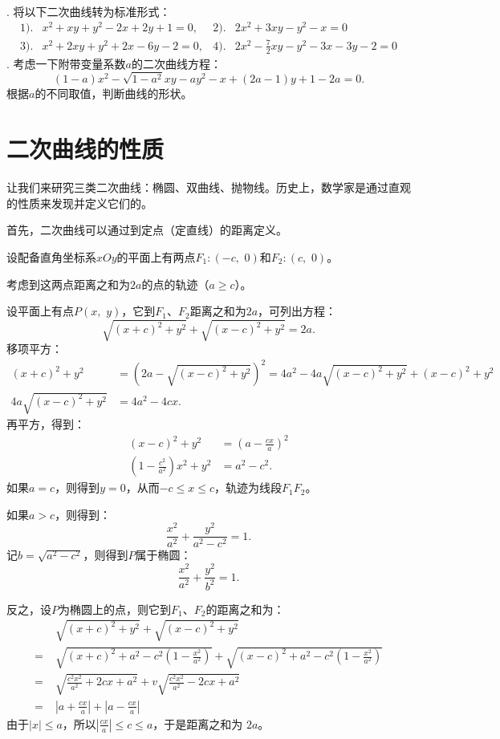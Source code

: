 \documentclass[12pt,UTF8]{ctexbook}
\begin{document}
\begin{xt}
    \mbox{} \\
    . 将以下二次曲线转为标准形式：
    \begin{align*}
        1).& x^2 + xy +y^2 - 2x + 2y + 1 = 0,  &2).& 2x^2 + 3xy -y^2 - x = 0 \\
        3).& x^2 + 2xy + y^2 + 2x - 6y - 2 = 0,  & 4).& 2x^2 - \frac{7}{2}xy - y^2 - 3x - 3y - 2 = 0 
    \end{align*}
    . 考虑一下附带变量系数$a$的二次曲线方程：
    $$ (1 - a)x^2 - \sqrt{1 - a^2}xy - ay^2 - x + (2a - 1)y + 1 - 2a = 0. $$
    根据$a$的不同取值，判断曲线的形状。
\end{xt}

\section{二次曲线的性质}

让我们来研究三类二次曲线：椭圆、双曲线、抛物线。历史上，数学家是通过直观的性质来发现并定义它们的。

首先，二次曲线可以通过到定点（定直线）的距离定义。

设配备直角坐标系$xOy$的平面上有两点$F_1:(-c,\,\,0)$和$F_2:(c,\,\,0)$。

考虑到这两点距离之和为$2a$的点的轨迹（$a\geqslant c$）。

设平面上有点$P(x, \,\,y)$，它到$F_1$、$F_2$距离之和为$2a$，可列出方程：
$$ \sqrt{(x + c)^2 + y^2} + \sqrt{(x - c)^2 + y^2} = 2a.$$
移项平方：
\begin{align*}
    (x + c)^2 + y^2 &= (2a - \sqrt{(x - c)^2 + y^2})^2 = 4a^2 - 4a\sqrt{(x - c)^2 + y^2} + (x - c)^2 + y^2 \\
    4a\sqrt{(x - c)^2 + y^2} &= 4a^2 - 4cx.
\end{align*}
再平方，得到：
\begin{align*}
    (x - c)^2 + y^2 &= \left(a - \frac{cx}{a}\right)^2 \\
    (1 - \frac{c^2}{a^2})x^2 + y^2 &= a^2 - c^2.
\end{align*}
如果$a = c$，则得到$y = 0$，从而$-c \leqslant x \leqslant c$，轨迹为线段$F_1F_2$。

如果$a > c$，则得到：
$$ \frac{x^2}{a^2} + \frac{y^2}{a^2 - c^2} = 1.$$
记$b = \sqrt{a^2 - c^2}$，则得到$P$属于椭圆：
$$ \frac{x^2}{a^2} + \frac{y^2}{b^2} = 1.$$

反之，设$P$为椭圆上的点，则它到$F_1$、$F_2$的距离之和为：
\begin{align*}
    &\;\sqrt{(x + c)^2 + y^2} + \sqrt{(x - c)^2 + y^2}  \\
    =&\;\sqrt{(x + c)^2 + a^2 - c^2\left(1 - \frac{x^2}{a^2}\right)} + \sqrt{(x - c)^2 + a^2 - c^2\left(1 - \frac{x^2}{a^2}\right)} \\
    =&\;\sqrt{\frac{c^2x^2}{a^2} + 2cx + a^2} + v\sqrt{\frac{c^2x^2}{a^2} - 2cx + a^2} \\
    =&\; \left|a + \frac{cx}{a}\right| + \left|a - \frac{cx}{a}\right|
\end{align*}
由于$|x| \leqslant a$，所以$\displaystyle\left|\frac{cx}{a}\right| \leqslant c \leqslant a$，于是距离之和为
$2a$。
\end{document}
